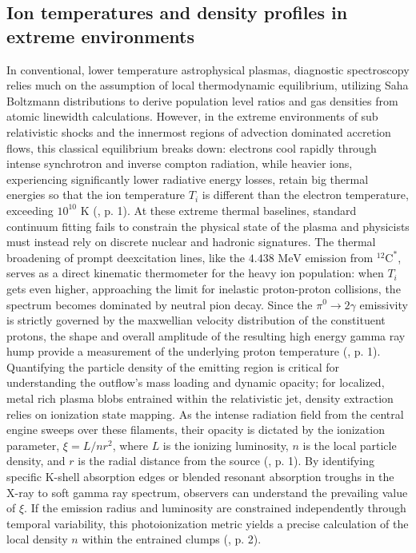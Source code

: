 \documentclass{aa} %
\begin{document}
\subsection{Ion temperatures and density profiles in extreme environments}
In conventional, lower temperature astrophysical plasmas, diagnostic spectroscopy relies much on the assumption of local thermodynamic equilibrium, utilizing Saha Boltzmann distributions to derive population level ratios and gas densities from atomic linewidth calculations. However, in the extreme environments of sub relativistic shocks and the innermost regions of advection dominated accretion flows, this classical equilibrium breaks down: electrons cool rapidly through intense synchrotron and inverse compton radiation, while heavier ions, experiencing significantly lower radiative energy losses, retain big thermal energies so that the ion temperature $T_i$ is different than the electron temperature, exceeding $10^{10} \text{ K}$ (\citet{Kafexhiuetal2019}, p. 1).
At these extreme thermal baselines, standard continuum fitting fails to constrain the physical state of the plasma and physicists must instead rely on discrete nuclear and hadronic signatures. The thermal broadening of prompt deexcitation lines, like the $4.438 \text{ MeV}$ emission from $^{12}\text{C}^*$, serves as a direct kinematic thermometer for the heavy ion population: when $T_i$ gets even higher, approaching the limit for inelastic proton-proton collisions, the spectrum becomes dominated by neutral pion decay. Since the $\pi^0 \rightarrow 2\gamma$ emissivity is strictly governed by the maxwellian velocity distribution of the constituent protons, the shape and overall amplitude of the resulting high energy gamma ray hump provide a measurement of the underlying proton temperature (\citet{Kafexhiuetal2019}, p. 1).
Quantifying the particle density of the emitting region is critical for understanding the outflow's mass loading and dynamic opacity; for localized, metal rich plasma blobs entrained within the relativistic jet, density extraction relies on ionization state mapping. As the intense radiation field from the central engine sweeps over these filaments, their opacity is dictated by the ionization parameter, $\xi = L / n r^2$, where $L$ is the ionizing luminosity, $n$ is the local particle density, and $r$ is the radial distance from the source (\citet{Haileyetal1999}, p. 1). By identifying specific K-shell absorption edges or blended resonant absorption troughs in the X-ray to soft gamma ray spectrum, observers can understand the prevailing value of $\xi$. If the emission radius and luminosity are constrained independently through temporal variability, this photoionization metric yields a precise calculation of the local density $n$ within the entrained clumps (\citet{Haileyetal1999}, p. 2).
\end{document}
